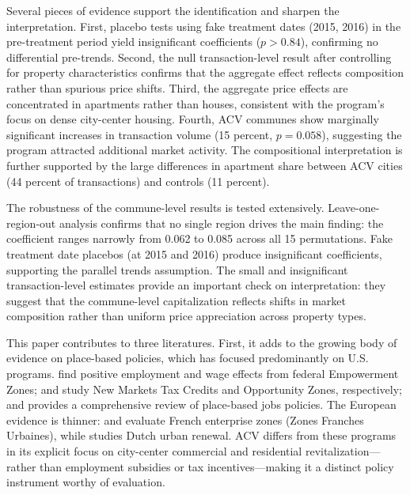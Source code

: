 \documentclass[12pt]{article}
\begin{document}
Several pieces of evidence support the identification and sharpen the interpretation. First, placebo tests using fake treatment dates (2015, 2016) in the pre-treatment period yield insignificant coefficients ($p > 0.84$), confirming no differential pre-trends. Second, the null transaction-level result after controlling for property characteristics confirms that the aggregate effect reflects composition rather than spurious price shifts. Third, the aggregate price effects are concentrated in apartments rather than houses, consistent with the program's focus on dense city-center housing. Fourth, ACV communes show marginally significant increases in transaction volume (15 percent, $p = 0.058$), suggesting the program attracted additional market activity. The compositional interpretation is further supported by the large differences in apartment share between ACV cities (44 percent of transactions) and controls (11 percent).

The robustness of the commune-level results is tested extensively. Leave-one-region-out analysis confirms that no single region drives the main finding: the coefficient ranges narrowly from 0.062 to 0.085 across all 15 permutations. Fake treatment date placebos (at 2015 and 2016) produce insignificant coefficients, supporting the parallel trends assumption. The small and insignificant transaction-level estimates provide an important check on interpretation: they suggest that the commune-level capitalization reflects shifts in market composition rather than uniform price appreciation across property types.

This paper contributes to three literatures. First, it adds to the growing body of evidence on place-based policies, which has focused predominantly on U.S. programs. \citet{busso2013assessing} find positive employment and wage effects from federal Empowerment Zones; \citet{freedman2017teaching} and \citet{gruber2019opportunity} study New Markets Tax Credits and Opportunity Zones, respectively; and \citet{bartik2020using} provides a comprehensive review of place-based jobs policies. The European evidence is thinner: \citet{mayer2017effects} and \citet{gobillon2012labor} evaluate French enterprise zones (Zones Franches Urbaines), while \citet{deGroot2016revitalization} studies Dutch urban renewal. ACV differs from these programs in its explicit focus on city-center commercial and residential revitalization---rather than employment subsidies or tax incentives---making it a distinct policy instrument worthy of evaluation.
\end{document}
